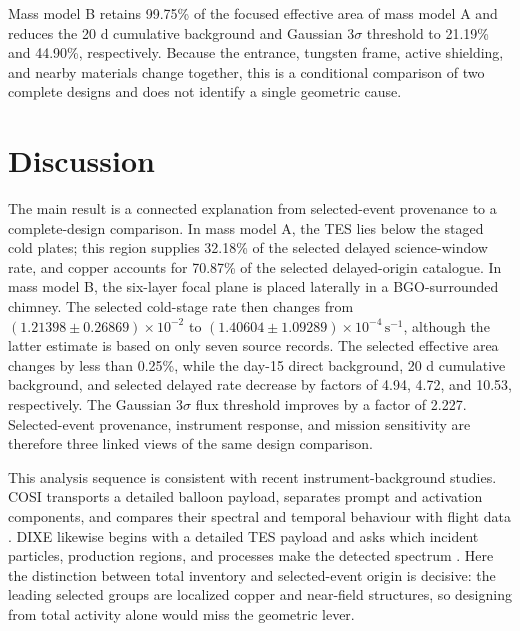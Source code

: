\documentclass[11pt]{article}
\newcommand{\cps}{\ensuremath{\,\mathrm{s^{-1}}}}
\begin{document}
Mass model B retains 99.75\% of the focused effective area of mass model A and reduces the 20 d cumulative background and Gaussian $3\sigma$ threshold to 21.19\% and 44.90\%, respectively. Because the entrance, tungsten frame, active shielding, and nearby materials change together, this is a conditional comparison of two complete designs and does not identify a single geometric cause.

\FloatBarrier

\section{Discussion}
\label{sec:discussion}

The main result is a connected explanation from selected-event provenance to a
complete-design comparison. In mass model A, the TES lies below the staged cold
plates; this region supplies 32.18\% of the selected delayed science-window rate,
and copper accounts for 70.87\% of the selected delayed-origin catalogue. In
mass model B, the six-layer focal plane is placed laterally in a BGO-surrounded
chimney. The selected cold-stage rate then changes from
$(1.21398\pm0.26869)\times10^{-2}$ to
$(1.40604\pm1.09289)\times10^{-4}\cps$, although the latter estimate is based on
only seven source records. The selected effective area changes by less than
0.25\%, while the day-15 direct background, 20 d cumulative background, and
selected delayed rate decrease by factors of 4.94, 4.72, and 10.53,
respectively. The Gaussian $3\sigma$ flux threshold improves by a factor of
2.227. Selected-event provenance, instrument response, and mission sensitivity
are therefore three linked views of the same design comparison.

This analysis sequence is consistent with recent instrument-background studies.
COSI transports a detailed balloon payload, separates prompt and activation
components, and compares their spectral and temporal behaviour with flight data
\cite{Gallego2025Balloon}. DIXE likewise begins with a detailed TES payload and
asks which incident particles, production regions, and processes make the
detected spectrum \cite{Tian2026DIXE}. Here the distinction between total
inventory and selected-event origin is decisive: the leading selected groups are
localized copper and near-field structures, so designing from total activity
alone would miss the geometric lever.
\end{document}
